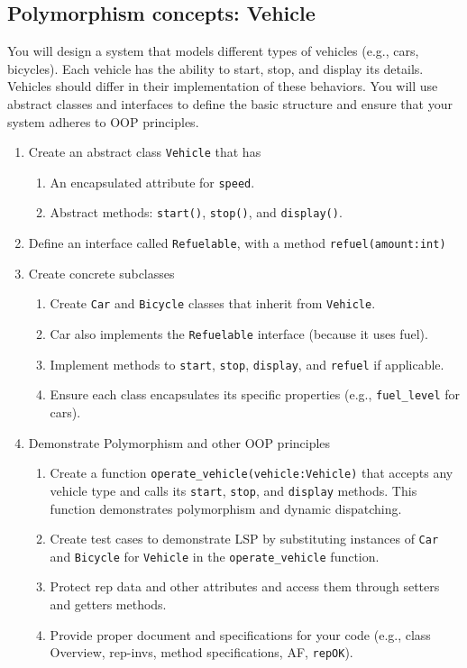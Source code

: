 \documentclass[oneside,11pt,dvipsnames]{book}
\newcommand{\code}[1]{\texttt{#1}}
\begin{document}
\subsection{Polymorphism concepts: Vehicle}\label{exercise:vehicle}

You will design a system that models different types of vehicles (e.g., cars, bicycles). Each vehicle has the ability to start, stop, and display its details. Vehicles should differ in their implementation of these behaviors. You will use abstract classes and interfaces to define the basic structure and ensure that your system adheres to OOP principles.

\begin{enumerate}
    \item Create an abstract class \code{Vehicle} that has
    \begin{enumerate}
        \item An encapsulated attribute for \code{speed}.
        \item Abstract methods: \code{start()}, \code{stop()}, and \code{display()}.
    \end{enumerate}
    \item Define an interface called \code{Refuelable}, with a method \code{refuel(amount:int)}
    \item Create concrete subclasses
    \begin{enumerate}
	    \item Create \code{Car} and \code{Bicycle} classes that inherit from \code{Vehicle}.
	    \item Car also implements the \code{Refuelable} interface (because it uses fuel).
	    \item Implement methods to \code{start}, \code{stop}, \code{display}, and \code{refuel} if applicable.
	    \item Ensure each class encapsulates its specific properties (e.g., \code{fuel\_level} for cars).
    \end{enumerate}
    \item Demonstrate Polymorphism and other OOP principles
    \begin{enumerate}
        \item Create a function \code{operate\_vehicle(vehicle:Vehicle)} that accepts any vehicle type and calls its \code{start}, \code{stop}, and \code{display} methods. This function demonstrates polymorphism and dynamic dispatching.
        \item Create test cases to demonstrate LSP by substituting instances of \code{Car} and \code{Bicycle} for \code{Vehicle} in the \code{operate\_vehicle} function. 
        \item Protect rep data and other attributes and access them through setters and getters methods.
    \item Provide proper document and specifications for your code (e.g., class Overview, rep-invs, method specifications, AF, \code{repOK}).
    \end{enumerate}

\end{enumerate}
\end{document}
